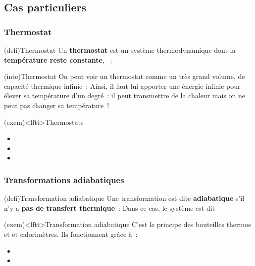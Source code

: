 \documentclass[../../main/main.tex]{subfiles}
\begin{document}
\subsection{Cas particuliers}
\subsubsection{Thermostat}
\begin{tcb*}(defi){Thermostat}
	Un \textbf{thermostat} est un système thermodynamique dont la
	\textbf{température reste constante}, ~:
	\psw{%
		\[
			\boxed{T\ind{thermostat} = \cte}
		\]
	}%
	\vspace{-15pt}
\end{tcb*}

\begin{tcb}(inte){Thermostat}
	On peut voir un thermostat comme un très grand volume, de capacité thermique
	infinie~:
	\psw{%
		\[
			\boxed{C_{V}\sup{thermostat} = +\infty}
		\]
	}%
	Ainsi, il faut lui apporter une énergie infinie pour élever sa température
	d'un degré~: il peut transmettre de la chaleur mais on ne peut pas changer sa
	température~!
\end{tcb}

\begin{tcb}(exem)<lftt>{Thermostats}
	\begin{itemize}
		\item {}
		\item {}
		\item {}
	\end{itemize}
\end{tcb}

\subsubsection{Transformations adiabatiques}
\begin{tcb*}(defi){Transformation adiabatique}
	Une transformation est dite \textbf{adiabatique} s'il n'y a \textbf{pas
		de transfert thermique}~:
	\psw{%
		\[
			\boxed{Q = 0}
		\]
	}%
	Dans ce cas, le système est dit 
\end{tcb*}

\begin{tcb}(exem)<lftt>{Transformation adiabatique}
	C'est le principe des bouteilles thermos et et calorimètres. Ils fonctionnent
	grâce à~:
	\begin{itemize}
		\item {}
		\item {}
	\end{itemize}
\end{tcb}
\end{document}
